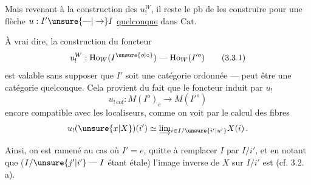 
Mais  revenant à la construction
des $u_!^W$, il reste le pb de les
construire pour une flèche $u:I'\unsure{\text{---}|\to}I$
\uline{quelconque} dans $\mathrm{Cat}$.

À vrai dire, la construction du foncteur
\[
u_!^W:\mathrm{Ho}_W(I^{\unsure{o|\circ}})\mathrel{\text{---}}\mathrm{Ho}_W(I'^o)
\tag*{(3.3.1)}
\]
est valable sans supposer que $I'$ soit une
catégorie ordonnée ---  peut être une
catégorie quelconque. Cela provient du
fait que le foncteur induit par $u_!$
\[
u_{!\,\mathrm{cof}}:M(I^o)_c\longrightarrow M(I'^o)
\]
 encore compatible avec les localiseurs,
comme on voit par le
calcul des fibres
\[
u_!(\unsure{x|X})(i')\simeq \underrightarrow{\lim}_{i\in I/\unsure{i'|u'}}X(i)\,.
\]

Ainsi, on est ramené au cas où $I'=e$,
quitte à remplacer $I$ par $I/i'$, et en
notant que ($I/\unsure{j'|i'}\mathrel{\text{---}}I$ étant étale) l'image
inverse de $X$ sur $I/i'$ est 
(cf. 3.2. a).
